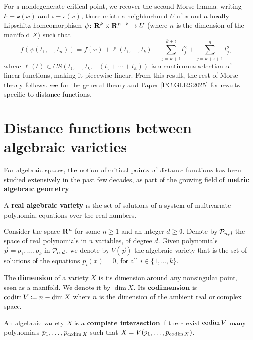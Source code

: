 For a nondegenerate critical point, we recover the second Morse lemma: writing $k = k(x)$ and $\iota = \iota(x)$, there exists a neighborhood $U$ of $x$ and a locally Lipschitz homeomorphism $\psi \colon \mathbf{R}^k \times \mathbf{R}^{n - k} \to U$ (where $n$ is the dimension of the manifold $X$) such that
\[
  f(\psi(t_1, \ldots, t_n)) = f(x) + \ell(t_1, \ldots, t_k) - \sum_{j = k + 1}^{k + \iota} t_j^2 + \sum_{j = k + \iota + 1}^n t_j^2,
\]
where $\ell(t) \in CS(t_1, \ldots, t_k, -(t_1 + \cdots + t_k))$ is a continuous selection of linear functions, making it piecewise linear. From this result, the rest of Morse theory follows: see \cite{APS1997} for the general theory and Paper \ref{PC:GLRS2025} for results specific to distance functions.

\section{Distance functions between algebraic varieties}

For algebraic spaces, the notion of critical points of distance functions has been studied extensively in the past few decades, as part of the growing field of \textbf{metric algebraic geometry} \cite{BKS2024,Weinstein2021}.

\begin{definition}
  A \textbf{real algebraic variety} is the set of solutions of a system of multivariate polynomial equations over the real numbers.
  
  Consider the space $\mathbf{R}^n$ for some $n \geq 1$ and an integer $d \geq 0$. Denote by $\mathcal{P}_{n, d}$ the space of real polynomials in $n$ variables, of degree $d$. Given polynomials $\vec{p} = p_1, \ldots, p_k$ in $\mathcal{P}_{n, d}$, we denote by $V(\vec{p})$ the algebraic variety that is the set of solutions of the equations $p_i(x) = 0$, for all $i \in \{1, \ldots, k\}$.
  
  The \textbf{dimension} of a variety $X$ is its dimension around any nonsingular point, seen as a manifold. We denote it by $\dim X$. Its \textbf{codimension} is $\operatorname{codim} V \coloneq n - \dim X$ where $n$ is the dimension of the ambient real or complex space.
  
  An algebraic variety $X$ is a \textbf{complete intersection} if there exist $\operatorname{codim} V$ many polynomials $p_1, \ldots, p_{\operatorname{codim} X}$ such that $X = V(p_1, \ldots, p_{\operatorname{codim} X})$.
\end{definition}

